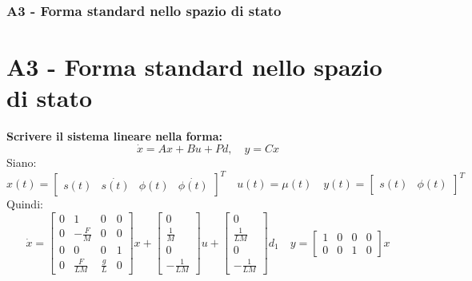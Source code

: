 \documentclass{beamer}
\begin{document}
\begin{frame}
	\frametitle{A3 - Forma standard nello spazio di stato}%
	\section{A3 - Forma standard nello spazio di stato}%
	\textbf{Scrivere il sistema lineare nella forma:\begin{equation*}
			\dot{x}=Ax+Bu+Pd,\quad y=Cx
		\end{equation*}}
	Siano:\begin{equation*}
		x(t)=\begin{bmatrix}
			s(t) & \dot{s(t)} & \phi(t) & \dot{\phi(t)}
		\end{bmatrix}^{T}\quad u(t)=\mu(t)\quad y(t)=\begin{bmatrix}
			s(t) & \phi(t)
		\end{bmatrix}^{T}
	\end{equation*}
	Quindi:\small
	\begin{equation*}
		\dot{x}=\begin{bmatrix}
			0 & 1            & 0           & 0 \\
			0 & -\frac{F}{M} & 0           & 0 \\
			0 & 0            & 0           & 1 \\
			0 & \frac{F}{LM} & \frac{g}{L} & 0
		\end{bmatrix}x+\begin{bmatrix}
			0 \\\frac{1}{M}\\0\\-\frac{1}{LM}
		\end{bmatrix}u+\begin{bmatrix}
			0 \\\frac{1}{LM}\\0\\-\frac{1}{LM}
		\end{bmatrix}d_{1}\quad y=\begin{bmatrix}
			1 & 0 & 0 & 0 \\0&0&1&0
		\end{bmatrix}x
	\end{equation*}
\end{frame}
\end{document}
